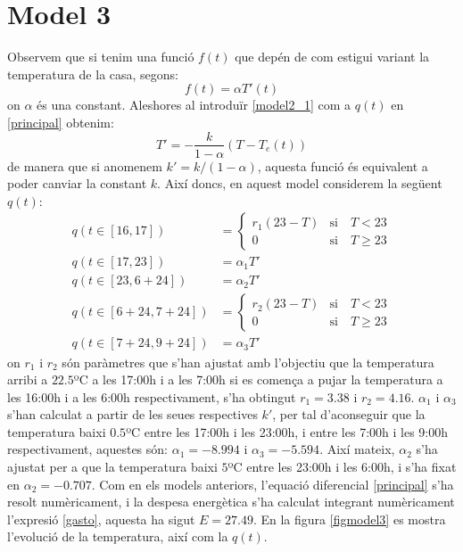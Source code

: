 \documentclass[11pt]{article}
\begin{document}
	\section{Model 3}
	Observem que si tenim una funció $f(t)$ que depén de com estigui variant la temperatura de la casa, segons:
	\begin{equation}\label{model2_1}
		f(t)=\alpha T'(t)
	\end{equation}
	on $\alpha$ és una constant. Aleshores al introduïr \eqref{model2_1} com a $q(t)$ en \eqref{principal} obtenim:
	\begin{equation}
		T'=-\frac{k}{1-\alpha}(T-T_e(t))
	\end{equation}
	de manera que si anomenem $k'=k/(1-\alpha)$, aquesta funció és equivalent a poder canviar la constant $k$. Així doncs, en aquest model considerem la següent $q(t)$:
	\begin{align} 
	q(t\in[16,17])&=
	\begin{cases}\label{pujar1}
	r_1(23-T)&\text{si}\quad T<23\\
	0&\text{si}\quad T\geq23
	\end{cases}
	\\
	q(t\in[17,23])&=\alpha_1T'\\
	q(t\in[23,6+24])&=\alpha_2T'\\
	q(t\in[6+24,7+24])&=
	\begin{cases}\label{pujar2}
	r_2(23-T)&\text{si}\quad T<23\\
	0&\text{si}\quad T\geq23
	\end{cases}
	\\
	q(t\in[7+24,9+24])&=\alpha_3T'
	\end{align}
	on $r_1$ i $r_2$ són paràmetres que s'han ajustat amb l'objectiu que la temperatura arribi a $22.5$ºC a les 17:00h i a les 7:00h si es comença a pujar la temperatura a les 16:00h i a les 6:00h respectivament, s'ha obtingut $r_1=3.38$ i $r_2=4.16$. $\alpha_1$ i $\alpha_3$ s'han calculat a partir de les seues respectives $k'$, per tal d'aconseguir que la temperatura baixi $0.5$ºC entre les 17:00h i les 23:00h, i entre les 7:00h i les 9:00h respectivament, aquestes són: $\alpha_1=-8.994$ i $\alpha_3=-5.594$. Així mateix, $\alpha_2$ s'ha ajustat per a que la temperatura baixi $5$ºC entre les 23:00h i les 6:00h, i s'ha fixat en $\alpha_2=-0.707$. Com en els models anteriors, l'equació diferencial \eqref{principal} s'ha resolt numèricament, i la despesa energètica s'ha calculat integrant numèricament l'expresió \eqref{gasto}, aquesta ha sigut $E=27.49$. En la figura \ref{figmodel3} es mostra l'evolució de la temperatura, així com la $q(t)$.\\
\end{document}
